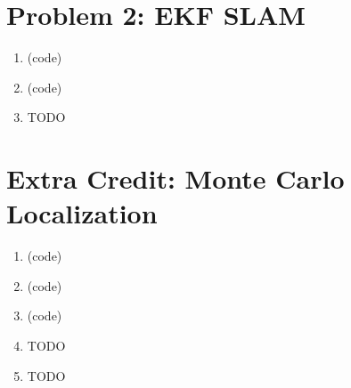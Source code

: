 \documentclass{article}
\begin{document}
\section*{Problem 2: EKF SLAM}
\begin{enumerate}[label=(\roman*)]
\item %
(code)

\item %
(code)

\item %
TODO

\end{enumerate}

\section*{Extra Credit: Monte Carlo Localization}
\begin{enumerate}[label=(\roman*)]
\item %
(code)

\item %
(code)

\item %
(code)

\item %
TODO

\item %
TODO

\end{enumerate}
\end{document}
